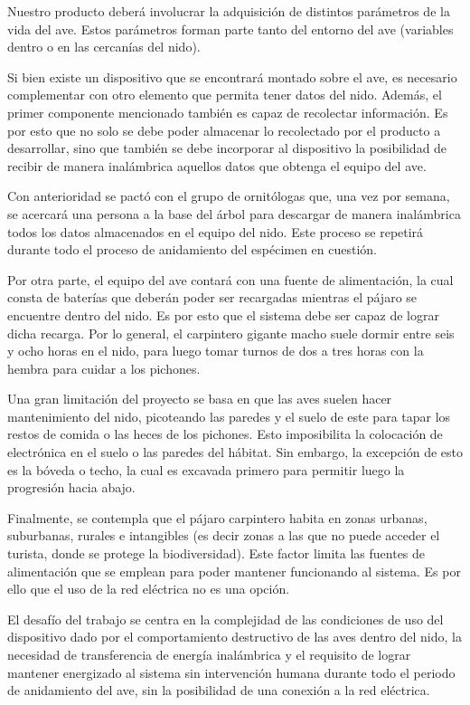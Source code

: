 Nuestro producto deberá involucrar la adquisición de distintos parámetros de la vida del ave. Estos parámetros forman parte tanto del entorno del ave (variables dentro o en las cercanías del nido). 

Si bien existe un dispositivo que se encontrará montado sobre el ave, es necesario complementar con otro elemento que permita tener datos del nido. Además, el primer componente mencionado también es capaz de recolectar información. Es por esto que no solo se debe poder almacenar lo recolectado por el producto a desarrollar, sino que también se debe incorporar al dispositivo la posibilidad de recibir de manera inalámbrica aquellos datos que obtenga el equipo del ave. 

Con anterioridad se pactó con el grupo de ornitólogas que, una vez por semana, se acercará una persona a la base del árbol para descargar de manera inalámbrica todos los datos almacenados en el equipo del nido. Este proceso se repetirá durante todo el proceso de anidamiento del espécimen en cuestión.

Por otra parte, el equipo del ave contará con una fuente de alimentación, la cual consta de baterías que deberán poder ser recargadas mientras el pájaro se encuentre dentro del nido. Es por esto que el sistema debe ser capaz de lograr dicha recarga. Por lo general, el carpintero gigante macho suele dormir entre seis y ocho horas en el nido, para luego tomar turnos de dos a tres horas con la hembra para cuidar a los pichones.

Una gran limitación del proyecto se basa en que las aves suelen hacer mantenimiento del nido, picoteando las paredes y el suelo de este para tapar los restos de comida o las heces de los pichones. Esto imposibilita la colocación de electrónica en el suelo o las paredes del hábitat. Sin embargo, la excepción de esto es la bóveda o techo, la cual es excavada primero para permitir luego la progresión hacia abajo.

Finalmente, se contempla que el pájaro carpintero habita en zonas urbanas, suburbanas, rurales e intangibles (es decir zonas a las que no puede acceder el turista, donde se protege la biodiversidad). Este factor limita las fuentes de alimentación que se emplean para poder mantener funcionando al sistema. Es por ello que el uso de la red eléctrica no es una opción.

El desafío del trabajo se centra en la complejidad de las condiciones de uso del dispositivo dado por el comportamiento destructivo de las aves dentro del nido, la necesidad de transferencia de energía inalámbrica y el requisito de lograr mantener energizado al sistema sin intervención humana durante todo el periodo de anidamiento del ave, sin la posibilidad de una conexión a la red eléctrica.